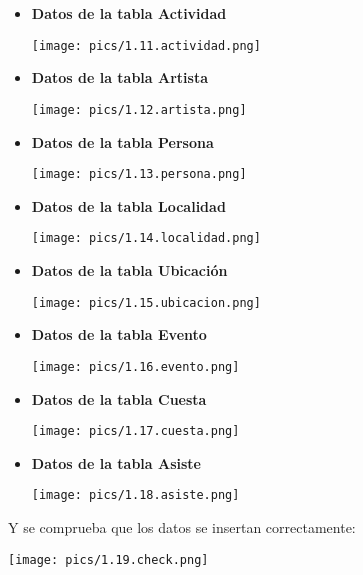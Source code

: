 \documentclass[12pt]{article}
\begin{document}
    \begin{itemize}
        \item \textbf{Datos de la tabla Actividad}
        \begin{center}{\texttt{[image: pics/1.11.actividad.png]}}\end{center}
        \item \textbf{Datos de la tabla Artista}
        \begin{center}{\texttt{[image: pics/1.12.artista.png]}}\end{center}
        \item \textbf{Datos de la tabla Persona}
        \begin{center}{\texttt{[image: pics/1.13.persona.png]}}\end{center}
        \item \textbf{Datos de la tabla Localidad}
        \begin{center}{\texttt{[image: pics/1.14.localidad.png]}}\end{center}
        \item \textbf{Datos de la tabla Ubicación}
        \begin{center}{\texttt{[image: pics/1.15.ubicacion.png]}}\end{center}
        \item \textbf{Datos de la tabla Evento}
        \begin{center}{\texttt{[image: pics/1.16.evento.png]}}\end{center}
        \item \textbf{Datos de la tabla Cuesta}
        \begin{center}{\texttt{[image: pics/1.17.cuesta.png]}}\end{center}
        \item \textbf{Datos de la tabla Asiste}
        \begin{center}{\texttt{[image: pics/1.18.asiste.png]}}\end{center}
    \end{itemize}

    Y se comprueba que los datos se insertan correctamente:

    \begin{center}{\texttt{[image: pics/1.19.check.png]}}\end{center}
\end{document}
